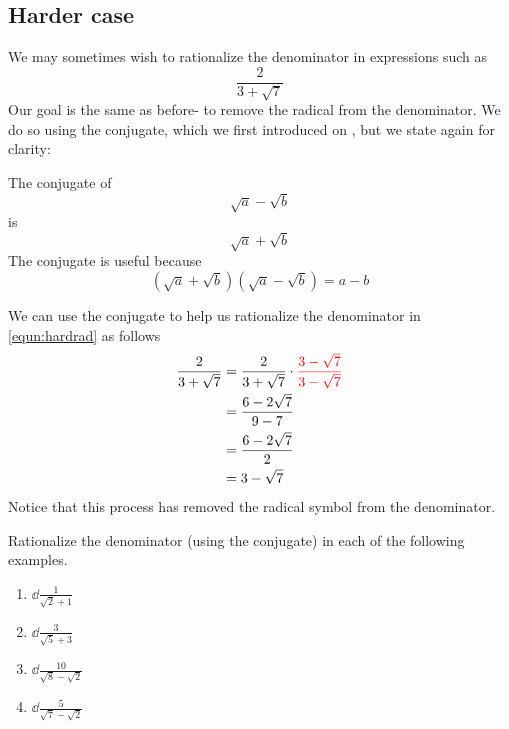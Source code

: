 \subsection{Harder case}
We may sometimes wish to rationalize the denominator in expressions such as 
\begin{equation}\label{equn:hardrad}
	\frac{2}{3+\sqrt{7}}
\end{equation}
Our goal is the same as before- to remove the radical from the denominator. We 
do so using the conjugate, which we first introduced on , 
but we state again for clarity:
\begin{myDefinition}
	The conjugate of
	\[
		\sqrt{a}-\sqrt{b}
	\]
	is 
	\[
		\sqrt{a}+\sqrt{b}
	\]
	The conjugate is useful because
	\[
		(\sqrt{a}+\sqrt{b})(\sqrt{a}-\sqrt{b}) = a-b
	\]
\end{myDefinition} 

We can use the conjugate to help us rationalize the denominator in \cref{equn:hardrad} as follows
\begin{align*}
	\frac{2}{3+\sqrt{7}} & =  \frac{2}{3+\sqrt{7}}\cdot {\color{red}\frac{3-\sqrt{7}}{3-\sqrt{7}}} \\
	                     & =  \frac{6-2\sqrt{7}}{9-7}                                              \\
	                     & =  \frac{6-2\sqrt{7}}{2}                                                \\
	                     & =  3 - \sqrt{7}                                                         
\end{align*} 
Notice that this process has removed the radical symbol from the denominator.

\begin{myexample}
\drillandskill
Rationalize the denominator (using the conjugate) in each of the following 
examples.
\end{myexample}
\begin{multicols}{2}
	\begin{enumerate}
		\item $\dd\frac{1}{\sqrt{2}+1}$
		\item $\dd\frac{3}{\sqrt{5}+3}$
		\item $\dd\frac{10}{\sqrt{8}-\sqrt{2}}$
		\item $\dd\frac{5}{\sqrt{7}-\sqrt{2}}$
	\end{enumerate}
\end{multicols}

